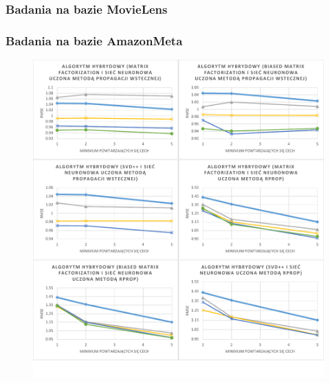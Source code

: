 \documentclass[twoside]{iisthesis}
\begin{document}
		\subsubsection{Badania na bazie MovieLens}
		
		\subsubsection{Badania na bazie AmazonMeta}
		



\begin{figure}[!ht]
	\centering
	\includegraphics[page=1,width=1\textwidth]{exphybrid_movielens1}
	\label{fig:exphybrid_movielens1a}
\end{figure}
\end{document}

